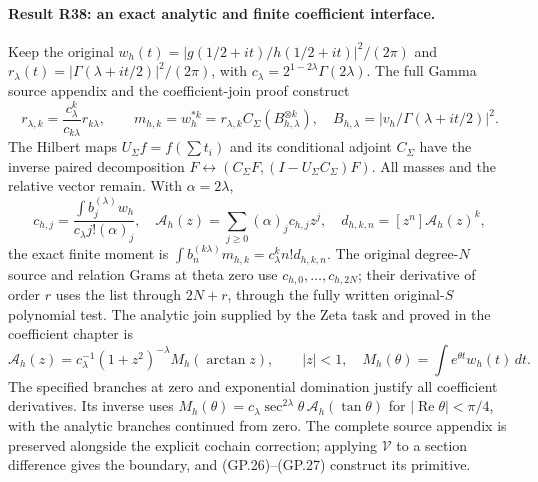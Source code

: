 \paragraph{Result R38: an exact analytic and finite coefficient interface.}
Keep the original $w_h(t)=|g(1/2+it)/h(1/2+it)|^2/(2\pi)$ and
$r_\lambda(t)=|\Gamma(\lambda+it/2)|^2/(2\pi)$, with
$c_\lambda=2^{1-2\lambda}\Gamma(2\lambda)$. The full Gamma source
appendix and the coefficient-join proof construct
\[
 r_{\lambda,k}=\frac{c_\lambda^k}{c_{k\lambda}}r_{k\lambda},\qquad
 m_{h,k}=w_h^{*k}=r_{\lambda,k}C_\Sigma(B_{h,\lambda}^{\otimes k}),
 \quad B_{h,\lambda}=|v_h/\Gamma(\lambda+it/2)|^2.
\]
The Hilbert maps $U_\Sigma f=f(\sum t_i)$ and its conditional adjoint
$C_\Sigma$ have the inverse paired decomposition
$F\leftrightarrow(C_\Sigma F,(I-U_\Sigma C_\Sigma)F)$.
All masses and the relative vector remain. With $\alpha=2\lambda$,
\[
 c_{h,j}=\frac{\int b_j^{(\lambda)}w_h}{c_\lambda j!(\alpha)_j},\quad
 \mathcal A_h(z)=\sum_{j\ge0}(\alpha)_jc_{h,j}z^j,\quad
 d_{h,k,n}=[z^n]\mathcal A_h(z)^k,
\]
the exact finite moment is
$\int b_n^{(k\lambda)}m_{h,k}=c_\lambda^kn!d_{h,k,n}$.
The original degree-$N$ source and relation Grams at theta zero use
$c_{h,0},\ldots,c_{h,2N}$; their derivative of order $r$ uses the
list through $2N+r$, through the fully written original-$S$ polynomial
test. The analytic join supplied by the Zeta task and proved in the
coefficient chapter is
\[
 \mathcal A_h(z)=c_\lambda^{-1}(1+z^2)^{-\lambda}
                   M_h(\arctan z),\qquad |z|<1,
 \quad M_h(\theta)=\int e^{\theta t}w_h(t)\,dt.
\]
The specified branches at zero and exponential domination justify
all coefficient derivatives. Its inverse uses
$M_h(\theta)=c_\lambda\sec^{2\lambda}\theta\,
\mathcal A_h(\tan\theta)$ for $|\operatorname{Re}\theta|<\pi/4$,
with the analytic branches continued from zero.
The complete source appendix is preserved alongside the explicit
cochain correction; applying $\mathcal V$ to a section difference
gives the boundary, and (GP.26)--(GP.27) construct its primitive.

